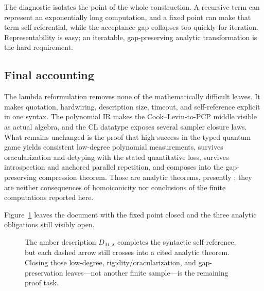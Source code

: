 The diagnostic isolates the point of the whole construction.  A recursive
term can represent an exponentially long computation, and a fixed point can
make that term self-referential, while the acceptance gap collapses too quickly
for iteration.  Representability is easy; an iteratable, gap-preserving
analytic transformation is the hard requirement.

\subsection{Final accounting}

The lambda reformulation removes none of the mathematically difficult leaves.
It makes quotation, hardwiring, description size, timeout, and self-reference
explicit in one syntax.  The polynomial IR makes the Cook--Levin-to-PCP middle
visible as actual algebra, and the CL datatype exposes several sampler closure
laws.  What remains unchanged is the proof that high success in the typed
quantum game yields consistent low-degree polynomial measurements, survives
oracularization and detyping with the stated quantitative loss, survives
introspection and anchored parallel repetition, and composes into the
gap-preserving compression theorem.  Those are analytic theorems, presently
; they are neither consequences of homoiconicity nor conclusions
of the finite computations reported here.

Figure~\ref{fig:D-final-seal} leaves the document with the fixed point closed
and the three analytic obligations still visibly open.
\begin{figure}[H]
\centering

\caption{The amber description \(D_{M,\lambda}\) completes the syntactic self-reference, but each dashed arrow still crosses into a cited analytic theorem.  Closing those low-degree, rigidity/oracularization, and gap-preservation leaves—not another finite sample—is the remaining proof task.}
\label{fig:D-final-seal}
\end{figure}
